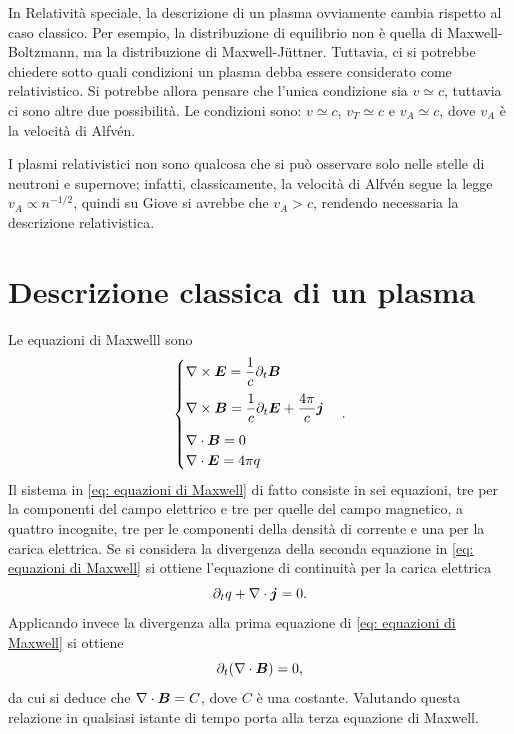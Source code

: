 In Relatività speciale, la descrizione di un plasma ovviamente cambia rispetto al caso classico. Per esempio, la distribuzione di equilibrio non è quella di Maxwell-Boltzmann, ma la distribuzione di Maxwell-J\"uttner. Tuttavia, ci si potrebbe chiedere sotto quali condizioni un plasma debba essere considerato come relativistico. Si potrebbe allora pensare che l'unica condizione sia $v \simeq c$, tuttavia ci sono altre due possibilità. Le condizioni sono: $v \simeq c$, $v_T \simeq c$ e $v_A \simeq c$, dove $v_A$ è la velocità di Alfvén.
\begin{obs}
    I plasmi relativistici non sono qualcosa che si può osservare solo nelle stelle di neutroni e supernove; infatti, classicamente, la velocità di Alfvén segue la legge $v_A \propto n^{-1/2}$, quindi su Giove si avrebbe che $v_A > c$, rendendo necessaria la descrizione relativistica.
\end{obs}

\section{Descrizione classica di un plasma}
Le equazioni di Maxwelll sono
\begin{equation}
\label{eq: equazioni di Maxwell}
    \begin{cases}
        \nabla \times \bm{E} = \dfrac{1}{c}\partial_t\bm{B} \\[2ex]
        \nabla \times \bm{B} = \dfrac{1}{c}\partial_t\bm{E} + \dfrac{4\pi}{c}\bm{j} \\[2ex]
        \nabla \cdot \bm{B} = 0 \\
        \nabla \cdot \bm{E} = 4\pi q
    \end{cases}.
\end{equation}
Il sistema in \eqref{eq: equazioni di Maxwell} di fatto consiste in sei equazioni, tre per la componenti del campo elettrico e tre per quelle del campo magnetico, a quattro incognite, tre per le componenti della densità di corrente e una per la carica elettrica. Se si considera la divergenza della seconda equazione in \eqref{eq: equazioni di Maxwell} si ottiene l'equazione di continuità per la carica elettrica
\begin{equation}
    \partial_t q + \nabla \cdot \bm{j} = 0.
\end{equation}
Applicando invece la divergenza alla prima equazione di \eqref{eq: equazioni di Maxwell} si ottiene
\begin{equation}
    \partial_t(\nabla \cdot \bm{B}) = 0,
\end{equation}
da cui si deduce che $\nabla \cdot \bm{B} = C$, dove $C$ è una costante. Valutando questa relazione in qualsiasi istante di tempo porta alla terza equazione di Maxwell.


